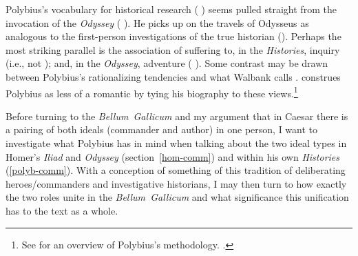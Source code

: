 \documentclass[12pt,letterpaper,oneside,final]{memoir}
\begin{document}
Polybius's   vocabulary for historical research ( ) seems pulled straight from the invocation of the \emph{Odyssey} (   ). He picks up on the travels of Odysseus as analogous to the first-person investigations of the true historian (). Perhaps the most striking parallel is the association of suffering to, in the \emph{Histories}, inquiry (i.e., not  ); and, in the \emph{Odyssey}, adventure (  ). Some contrast may be drawn between Polybius's rationalizing tendencies and what Walbank calls . \textcite{luce1997} construes Polybius as less of a romantic by tying his biography to these views.\footnote{See \textcite[6--13]{walbank2002} for an overview of Polybius's methodology. .}

Before turning to the \emph{Bellum~Gallicum} and my argument that in Caesar there is a pairing of both ideals (commander and author) in one person, I want to investigate what Polybius has in mind when talking about the two ideal types in Homer's \emph{Iliad} and \emph{Odyssey} (section~\ref{hom-comm}) and within his own \emph{Histories} (\ref{polyb-comm}). With a conception of something of this tradition of deliberating heroes/commanders and investigative historians, I may then turn to how exactly the two roles unite in the \emph{Bellum~Gallicum} and what significance this unification has to the text as a whole.
\end{document}
